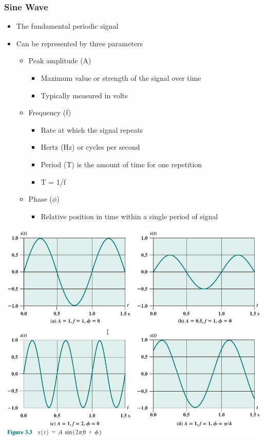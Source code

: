 \documentclass[pdflatex,compress]{beamer}
\begin{document}
\begin{frame}
	\frametitle{Sine Wave}
	\begin{itemize}
		\item The fundamental periodic signal
		\item Can be represented by three parameters
		\begin{itemize}
			\item Peak amplitude (A)
			\begin{itemize}
				\item Maximum value or strength of the signal over time
				\item Typically measured in volts
			\end{itemize}
			\item Frequency (f)
			\begin{itemize}
				\item Rate at which the signal repeats
				\item Hertz (Hz) or cycles per second
				\item Period (T) is the amount of time for one repetition
				\item T = 1/f
			\end{itemize}
			\item Phase ($ \phi $)
			\begin{itemize}
				\item Relative position in time within a single period of signal
			\end{itemize}
		\end{itemize}
	\end{itemize}
\end{frame}

\begin{frame}
	\begin{center}
		\includegraphics[height=0.9\textheight]{img/img03}
	\end{center}
\end{frame}
\end{document}
